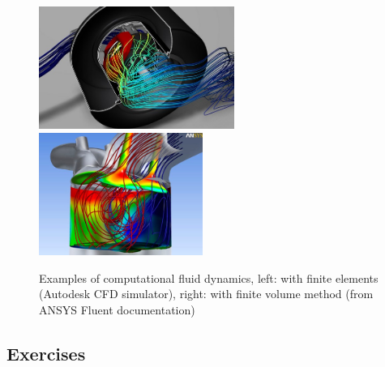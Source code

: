 \documentclass{digitaldynamics}
\begin{document}
\begin{itemize}
\end{itemize}


\begin{figure}
		\centering
			\includegraphics[height=4cm]{pics/es_cfd.jpg}
			\includegraphics[height=4cm]{pics/es_cfd2.jpg}
		\caption{Examples of computational fluid dynamics, left: with finite elements (Autodesk CFD simulator), right: with finite volume method (from ANSYS Fluent documentation)}
		\label{fig:es_cfd}
	\end{figure}


\subsection{Exercises}
\end{document}
